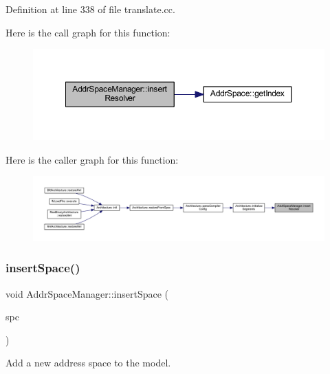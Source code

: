 Definition at line 338 of file translate.\+cc.

Here is the call graph for this function\+:
\nopagebreak
\begin{figure}[H]
\begin{center}
\leavevmode
\includegraphics[width=350pt]{class_addr_space_manager_a6330481f1f40a24d860c820a5a2b64f5_cgraph}
\end{center}
\end{figure}
Here is the caller graph for this function\+:
\nopagebreak
\begin{figure}[H]
\begin{center}
\leavevmode
\includegraphics[width=350pt]{class_addr_space_manager_a6330481f1f40a24d860c820a5a2b64f5_icgraph}
\end{center}
\end{figure}
\mbox{\label{class_addr_space_manager_a89658bd677414a271a918f0f37af0bd6}} 
\subsubsection{\texorpdfstring{insertSpace()}{insertSpace()}}
{\footnotesize\ttfamily void Addr\+Space\+Manager\+::insert\+Space (\begin{DoxyParamCaption}\item[{\mbox{\hyperlink{class_addr_space}{Addr\+Space}} $\ast$}]{spc }\end{DoxyParamCaption})\hspace{0.3cm}{\ttfamily [protected]}}



Add a new address space to the model. 

